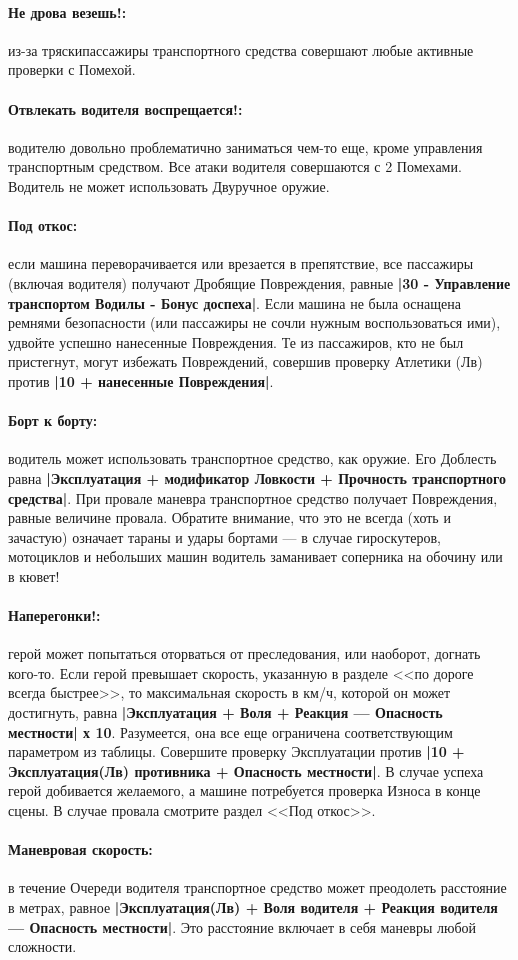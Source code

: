 \paragraph{Не дрова везешь!:} из-за тряскипассажиры транспортного средства совершают любые активные проверки с Помехой.
\paragraph{Отвлекать водителя воспрещается!:} водителю довольно проблематично заниматься чем-то еще, кроме управления транспортным средством. Все атаки водителя совершаются с 2 Помехами. Водитель не может использовать Двуручное оружие.
\paragraph{Под откос:} если машина переворачивается или врезается в препятствие, все пассажиры (включая водителя) получают Дробящие Повреждения, равные \textbf{|30 - Управление транспортом Водилы - Бонус доспеха|}. Если машина не была оснащена ремнями безопасности (или пассажиры не сочли нужным воспользоваться ими), удвойте успешно нанесенные Повреждения.
\newline
Те из пассажиров, кто не был пристегнут, могут избежать Повреждений, совершив проверку Атлетики (Лв) против \textbf{|10 + нанесенные Повреждения|}.
\paragraph{Борт к борту:} водитель может использовать транспортное средство, как оружие. Его Доблесть равна \textbf{|Эксплуатация + модификатор Ловкости + Прочность транспортного средства|}. При провале маневра транспортное средство получает Повреждения, равные величине провала. Обратите внимание, что это не всегда (хоть и зачастую) означает тараны и удары бортами — в случае гироскутеров, мотоциклов и небольших машин водитель заманивает соперника на обочину или в кювет!
\paragraph{Наперегонки!:} герой может попытаться оторваться от преследования, или наоборот, догнать кого-то. Если герой превышает скорость, указанную в разделе <<по дороге всегда быстрее>>, то максимальная скорость в км/ч, которой он может достигнуть, равна \textbf{|Эксплуатация + Воля + Реакция — Опасность местности| х 10}. Разумеется, она все еще ограничена соответствующим параметром из таблицы. Совершите проверку Эксплуатации против \textbf{|10 + Эксплуатация(Лв) противника + Опасность местности|}. В случае успеха герой добивается желаемого, а машине потребуется проверка Износа в конце сцены. В случае провала смотрите раздел <<Под откос>>.
\paragraph{Маневровая скорость:} в течение Очереди водителя транспортное средство может преодолеть расстояние в метрах, равное \textbf{|Эксплуатация(Лв) + Воля водителя + Реакция водителя — Опасность местности|}. Это расстояние включает в себя маневры любой сложности.